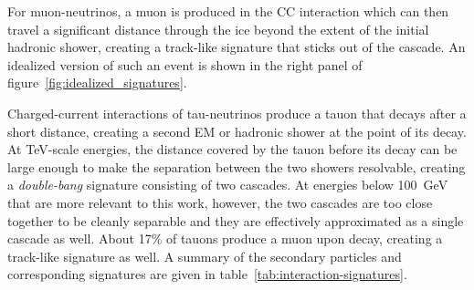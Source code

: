 For muon-neutrinos, a muon is produced in the CC interaction which can then travel a significant distance through the ice beyond the extent of the initial hadronic shower, creating a track-like signature that sticks out of the cascade. An idealized version of such an event is shown in the right panel of figure~\ref{fig:idealized_signatures}.

Charged-current interactions of tau-neutrinos produce a tauon that decays after a short distance, creating a second EM or hadronic shower at the point of its decay. At TeV-scale energies, the distance covered by the tauon before its decay can be large enough to make the separation between the two showers resolvable, creating a \emph{double-bang} signature consisting of two cascades. At energies below 100~GeV that are more relevant to this work, however, the two cascades are too close together to be cleanly separable and they are effectively approximated as a single cascade as well. About 17\% of tauons produce a muon upon decay, creating a track-like signature as well. A summary of the secondary particles and corresponding signatures are given in table~\ref{tab:interaction-signatures}.

